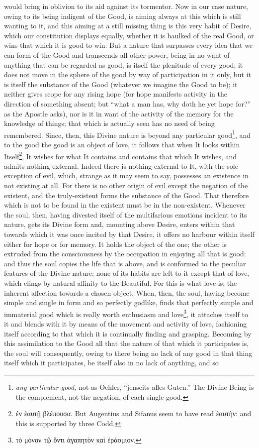 would bring in oblivion to its aid against its tormentor. Now in our case nature, owing to its being indigent of the Good, is aiming always at this which is still wanting to it, and this aiming at a still missing thing is this very habit of Desire, which our constitution displays equally, whether it is baulked of the real Good, or wins that which it is good to win. But a nature that surpasses every idea that we can form of the Good and transcends all other power, being in no want of anything that can be regarded as good, is itself the plenitude of every good; it does not move in the sphere of the good by way of participation in it only, but it is itself the substance of the Good (whatever we imagine the Good to be); it neither gives scope for any rising hope (for hope manifests activity in the direction of something absent; but “what a man has, why doth he yet hope for?” as the Apostle asks), nor is it in want of the activity of the memory for the knowledge of things; that which is actually seen has no need of being remembered. Since, then, this Divine nature is beyond any particular good\footnote{\emph{any particular good,} not as Oehler, “jenseits alles Guten.” The Divine Being is the complement, not the negation, of each single good.}, and to the good the good is an object of love, it follows that when It looks within Itself\footnote{\textgreek{ἐν ἑαυτῇ βλέπουσα}. But Augentius and Sifanus seem to have read \textgreek{ἑαυτὴν}: and this is supported by three Codd.}, It wishes for what It contains and contains that which It wishes, and admits nothing external. Indeed there is nothing external to It, with the sole exception of evil, which, strange as it may seem to say, possesses an existence in not existing at all. For there is no other origin of evil except the negation of the existent, and the truly-existent forms the substance of the Good. That therefore which is not to be found in the existent must be in the non-existent. Whenever the soul, then, having divested itself of the multifarious emotions incident to its nature, gets its Divine form and, mounting above Desire, enters within that towards which it was once incited by that Desire, it offers no harbour within itself either for hope or for memory. It holds the object of the one; the other is extruded from the consciousness by the occupation in enjoying all that is good: and thus the soul copies the life that is above, and is conformed to the peculiar features of the Divine nature; none of its habits are left to it except that of love, which clings by natural affinity to the Beautiful. For this is what love is; the inherent affection towards a chosen object. When, then, the soul, having become simple and single in form and so perfectly godlike, finds that perfectly simple and immaterial good which is really worth enthusiasm and love\footnote{\textgreek{τὸ μόνον τῷ ὄντι ἀγαπητὸν καὶ ἐράσμιον}.}, it attaches itself to it and blends with it by means of the movement and activity of love, fashioning itself according to that which it is continually finding and grasping. Becoming by this assimilation to the Good all that the nature of that which it participates is, the soul will consequently, owing to there being no lack of any good in that thing itself which it participates, be itself also in no lack of anything, and so 